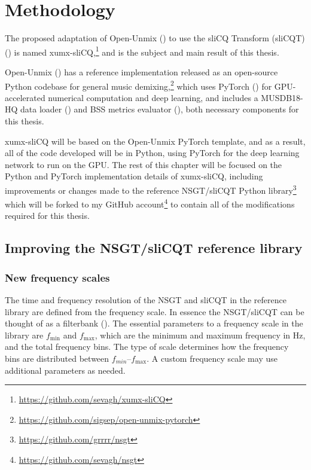 \documentclass[report.tex]{subfiles}
\begin{document}
\section{Methodology}
\label{sec:methodology}

The proposed adaptation of Open-Unmix (\cite{umx}) to use the sliCQ Transform (sliCQT) (\cite{invertiblecqt, slicq}) is named xumx-sliCQ,\footnote{\url{https://github.com/sevagh/xumx-sliCQ}} and is the subject and main result of this thesis.

Open-Unmix (\cite{umx}) has a reference implementation released as an open-source Python codebase for general music demixing,\footnote{\url{https://github.com/sigsep/open-unmix-pytorch}} which uses PyTorch (\cite{pytorch}) for GPU-accelerated numerical computation and deep learning, and includes a MUSDB18-HQ data loader (\cite{musdb18hq}) and BSS metrics evaluator (\cite{bss}), both necessary components for this thesis.

xumx-sliCQ will be based on the Open-Unmix PyTorch template, and as a result, all of the code developed will be in Python, using PyTorch for the deep learning network to run on the GPU. The rest of this chapter will be focused on the Python and PyTorch implementation details of xumx-sliCQ, including improvements or changes made to the reference NSGT/sliCQT Python library\footnote{\url{https://github.com/grrrr/nsgt}} which will be forked to my GitHub account\footnote{\url{https://github.com/sevagh/nsgt}} to contain all of the modifications required for this thesis.

\subsection{Improving the NSGT/sliCQT reference library}
\label{sec:improvelib}

\subsubsection{New frequency scales}
\label{sec:freqscales}

The time and frequency resolution of the NSGT and sliCQT in the reference library are defined from the frequency scale. In essence the NSGT/sliCQT can be thought of as a filterbank (\cite{variableq1}). The essential parameters to a frequency scale in the library are $f_{\text{min}}$ and $f_{\text{max}}$, which are the minimum and maximum frequency in Hz, and the total frequency bins. The type of scale determines how the frequency bins are distributed between $f_{min}$--$f_{\text{max}}$. A custom frequency scale may use additional parameters as needed.
\end{document}
